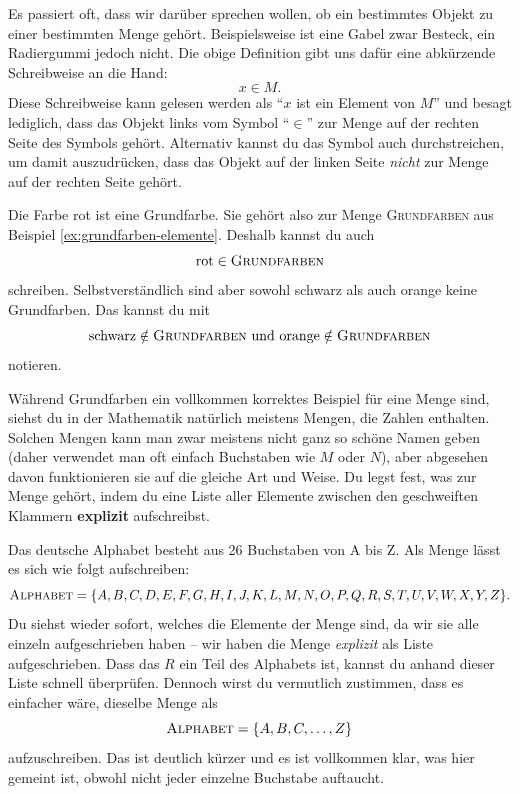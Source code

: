 \documentclass[../../main.tex]{subfiles}
\begin{document}
Es passiert oft, dass wir darüber sprechen wollen, ob ein bestimmtes Objekt zu einer bestimmten Menge gehört. Beispielsweise ist eine Gabel zwar Besteck, ein Radiergummi jedoch nicht. Die obige Definition gibt uns dafür eine abkürzende Schreibweise an die Hand:
\[x\in M.\]
Diese Schreibweise kann gelesen werden als \enquote{$x$ ist ein Element von $M$} und besagt lediglich, dass das Objekt links vom Symbol \enquote{$\in$} zur Menge auf der rechten Seite des Symbols gehört. Alternativ kannst du das Symbol auch durchstreichen, um damit auszudrücken, dass das Objekt auf der linken Seite \emph{nicht} zur Menge auf der rechten Seite gehört.

\begin{example}{}
    Die Farbe rot ist eine Grundfarbe. Sie gehört also zur Menge \textsc{Grundfarben} aus Beispiel \ref{ex:grundfarben-elemente}. Deshalb kannst du auch
    \[\text{rot}\in\textsc{Grundfarben}\]
    schreiben. Selbstverständlich sind aber sowohl schwarz als auch orange keine Grundfarben. Das kannst du mit
    \[\text{schwarz}\notin\textsc{Grundfarben}~\text{und}~\text{orange}\notin\textsc{Grundfarben}\]
    notieren.
\end{example}

Während Grundfarben ein vollkommen korrektes Beispiel für eine Menge sind, siehst du in der Mathematik natürlich meistens Mengen, die Zahlen enthalten. Solchen Mengen kann man zwar meistens nicht ganz so schöne Namen geben (daher verwendet man oft einfach Buchstaben wie $M$ oder $N$), aber abgesehen davon funktionieren sie auf die gleiche Art und Weise. Du legst fest, was zur Menge gehört, indem du eine Liste aller Elemente zwischen den geschweiften Klammern \textbf{explizit} aufschreibst.

\begin{example}[ex:alphabet]{}
    Das deutsche Alphabet besteht aus 26 Buchstaben von A bis Z. Als Menge lässt es sich wie folgt aufschreiben:
    \[\textsc{Alphabet}=\{A,B,C,D,E,F,G,H,I,J,K,L,M,N,O,P,Q,R,S,T,U,V,W,X,Y,Z\}.\]
    Du siehst wieder sofort, welches die Elemente der Menge sind, da wir sie alle einzeln aufgeschrieben haben -- wir haben die Menge \emph{explizit} als Liste aufgeschrieben. Dass das $R$ ein Teil des Alphabets ist, kannst du anhand dieser Liste schnell überprüfen. Dennoch wirst du vermutlich zustimmen, dass es einfacher wäre, dieselbe Menge als
    \[\textsc{Alphabet}=\{A,B,C,\dots,Z\}\]
    aufzuschreiben. Das ist deutlich kürzer und es ist vollkommen klar, was hier gemeint ist, obwohl nicht jeder einzelne Buchstabe auftaucht.
\end{example}
\end{document}
